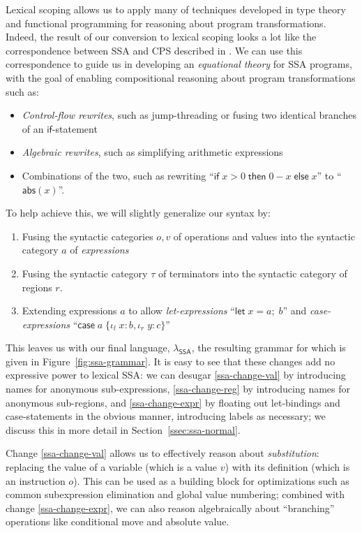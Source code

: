 \documentclass[acmsmall,screen,review]{acmart}
\newcommand{\ms}[1]{\ensuremath{\mathsf{#1}}}
\newcommand{\lto}{:}
\newcommand{\linl}[1]{\iota_l\;{#1}}
\newcommand{\linr}[1]{\iota_r\;{#1}}
\newcommand{\letexpr}[3]{\ensuremath{\ms{let}\;#1 = #2;\;#3}}
\newcommand{\caseexpr}[5]{\ms{case}\;#1\;\{\linl{#2} \lto #3, \linr{#4} \lto #5\}}
\newcommand{\isotopessa}{\(\lambda_{\ms{SSA}}\)}
\begin{document}
Lexical scoping allows us to apply many of techniques developed in type theory
and functional programming for reasoning about program transformations. 
Indeed, the result of our conversion to lexical scoping looks a lot like the correspondence
between SSA and CPS described in \citet{kelsey-95-cps}. We can use this correspondence to guide us
in developing an \textit{equational theory} for SSA programs, with the goal of enabling
compositional reasoning about program transformations such as:
\begin{itemize}
  \item \textit{Control-flow rewrites}, such as jump-threading or fusing two identical branches of
  an \ms{if}-statement
  \item \textit{Algebraic rewrites}, such as simplifying arithmetic expressions
  \item Combinations of the two, such as rewriting ``$\ms{if}\;x > 0\;\ms{then}\;0 - x\;\ms{else}\;
  x$'' to ``$\ms{abs}(x)$''.
\end{itemize}
To help achieve this, we will slightly generalize our syntax by:
\begin{enumerate}
  \item Fusing the syntactic categories $o, v$ of operations and values into the syntactic category
  $a$ of \emph{expressions} \label{ssa-change-val}
  \item Fusing the syntactic category $\tau$ of terminators into the syntactic category of regions
  $r$. \label{ssa-change-reg}
  \item Extending expressions $a$ to allow \emph{let-expressions} ``$\letexpr{x}{a}{b}$'' and
  \emph{case-expressions} ``$\caseexpr{a}{x}{b}{y}{c}$'' \label{ssa-change-expr}
\end{enumerate}
This leaves us with our final language, \isotopessa{}, the resulting grammar for which is given in
Figure~\ref{fig:ssa-grammar}. It is easy to see that these changes add no expressive power to
lexical SSA: we can desugar \ref{ssa-change-val} by introducing names for anonymous sub-expressions,
\ref{ssa-change-reg} by introducing names for anonymous sub-regions, and \ref{ssa-change-expr} by
floating out let-bindings and case-statements in the obvious manner, introducing labels as
necessary; we discuss this in more detail in Section~\ref{ssec:ssa-normal}.

Change \ref{ssa-change-val} allows us to effectively reason about \emph{substitution}: replacing the
value of a variable (which is a value $v$) with its definition (which is an instruction $o$). This
can be used as a building block for optimizations such as common subexpression elimination and
global value numbering; combined with change \ref{ssa-change-expr}, we can also reason algebraically
about ``branching'' operations like conditional move and absolute value.
\end{document}
